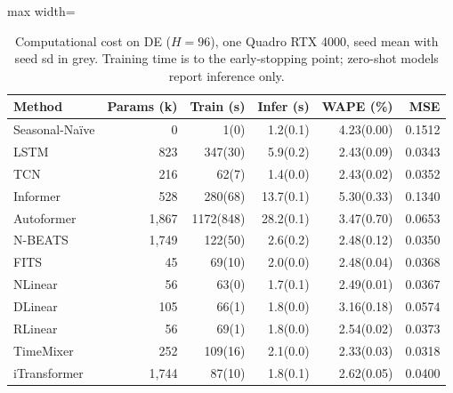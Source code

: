 \begin{table}[!t]
\centering
\caption{Computational cost on DE ($H=96$), one Quadro RTX 4000, seed mean with seed sd in grey. Training time is to the early-stopping point; zero-shot models report inference only.}
\label{tab:cost-v2}
\setlength{\tabcolsep}{4pt}\footnotesize
\begin{adjustbox}{max width=\linewidth}
\begin{tabular}{lrrrrr}
\toprule
Method & Params (k) & Train (s) & Infer (s) & WAPE (\%) & MSE \\
\midrule
Seasonal-Na\"ive & 0 & 1{\scriptsize\color{gray}(0)} & 1.2{\scriptsize\color{gray}(0.1)} & 4.23{\scriptsize\color{gray}(0.00)} & 0.1512 \\
LSTM & 823 & 347{\scriptsize\color{gray}(30)} & 5.9{\scriptsize\color{gray}(0.2)} & 2.43{\scriptsize\color{gray}(0.09)} & 0.0343 \\
TCN & 216 & 62{\scriptsize\color{gray}(7)} & 1.4{\scriptsize\color{gray}(0.0)} & 2.43{\scriptsize\color{gray}(0.02)} & 0.0352 \\
Informer & 528 & 280{\scriptsize\color{gray}(68)} & 13.7{\scriptsize\color{gray}(0.1)} & 5.30{\scriptsize\color{gray}(0.33)} & 0.1340 \\
Autoformer & 1{,}867 & 1172{\scriptsize\color{gray}(848)} & 28.2{\scriptsize\color{gray}(0.1)} & 3.47{\scriptsize\color{gray}(0.70)} & 0.0653 \\
N-BEATS & 1{,}749 & 122{\scriptsize\color{gray}(50)} & 2.6{\scriptsize\color{gray}(0.2)} & 2.48{\scriptsize\color{gray}(0.12)} & 0.0350 \\
FITS & 45 & 69{\scriptsize\color{gray}(10)} & 2.0{\scriptsize\color{gray}(0.0)} & 2.48{\scriptsize\color{gray}(0.04)} & 0.0368 \\
NLinear & 56 & 63{\scriptsize\color{gray}(0)} & 1.7{\scriptsize\color{gray}(0.1)} & 2.49{\scriptsize\color{gray}(0.01)} & 0.0367 \\
DLinear & 105 & 66{\scriptsize\color{gray}(1)} & 1.8{\scriptsize\color{gray}(0.0)} & 3.16{\scriptsize\color{gray}(0.18)} & 0.0574 \\
RLinear & 56 & 69{\scriptsize\color{gray}(1)} & 1.8{\scriptsize\color{gray}(0.0)} & 2.54{\scriptsize\color{gray}(0.02)} & 0.0373 \\
TimeMixer & 252 & 109{\scriptsize\color{gray}(16)} & 2.1{\scriptsize\color{gray}(0.0)} & 2.33{\scriptsize\color{gray}(0.03)} & 0.0318 \\
iTransformer & 1{,}744 & 87{\scriptsize\color{gray}(10)} & 1.8{\scriptsize\color{gray}(0.1)} & 2.62{\scriptsize\color{gray}(0.05)} & 0.0400 \\

\end{tabular}
\end{adjustbox}
\end{table}
